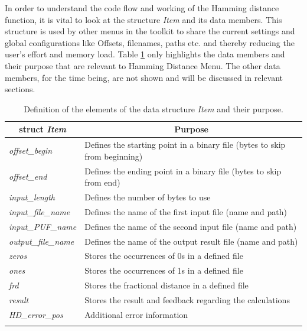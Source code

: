 In order to understand the code flow and working of the Hamming distance function, it is vital to look at the structure \emph{Item} and its data members. This structure is used by other menus in the toolkit to share the current settings and global configurations like Offsets, filenames, paths etc. and thereby reducing the user's effort and memory load. Table \ref{table:item} only highlights the data members and their purpose that are relevant to Hamming Distance Menu. The other data
members, for the time being, are not shown and will be discussed in relevant sections.\\

\begin{table}[!ht]
	\begin{center}
		\begin{tabular}{ll}
			\toprule
			\multicolumn{1}{c}{\textbf{struct \emph{Item}}} & \multicolumn{1}{c}{\textbf{Purpose}}\\
			\midrule
			\hline

			\emph{offset\_begin} & Defines the starting point in a binary file (bytes to skip from beginning)\\

			\emph{offset\_end} & Defines the ending point in a binary file (bytes to skip from end)\\

			\emph{input\_length} & Defines the number of bytes to use \\

			\emph{input\_file\_name} & Defines the name of the first input file (name and path)\\

			\emph{input\_PUF\_name} & Defines the name of the second input file (name and path)\\

			\emph{output\_file\_name} & Defines the name of the output result file (name and path)\\

			\emph{zeros} & Stores the occurrences of 0s in a defined file\\

			\emph{ones} & Stores the occurrences of 1s in a defined file\\

			\emph{frd} & Stores the fractional distance in a defined file\\

			\emph{result} & Stores the result and feedback regarding the calculations\\

			\emph{HD\_error\_pos} & Additional error information \\

			\hline
			\addlinespace
			\bottomrule
		\end{tabular}
	\end{center}
	\caption{Definition of the elements of the data structure \emph{Item} and their purpose.}
	\label{table:item}
\end{table}

